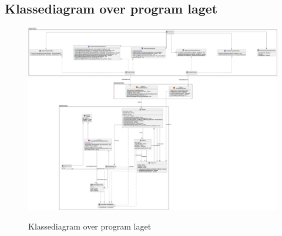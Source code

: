 
\begin{landscape}
    \section{Klassediagram over program laget}\label{apdx:classDiagram_full}
    \begin{figure}[H]
        \centering
        \caption{Klassediagram over program laget}
        \includegraphics[width = \linewidth, keepaspectratio]{TaskFusion/out/assets/diagrams/class_persistency_full/ClassDiagram_full.png}
        \label{fig:classDiagram_full}
    \end{figure}
\end{landscape}

